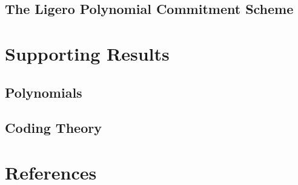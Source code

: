 \section{The Ligero Polynomial Commitment Scheme}


\chapter{Supporting Results}

\section{Polynomials}

\begin{definition}
    \label{def:multilinear_extension}
\end{definition}

\begin{theorem}
    \label{thm:multilinear_extension_unique}
\end{theorem}

\section{Coding Theory}

\begin{definition}
    \label{def:code_distance}
\end{definition}

\begin{definition}
    \label{def:distance_from_code}
\end{definition}

\begin{definition}
    \label{def:generator_matrix}
\end{definition}

\begin{definition}
    \label{def:parity_check_matrix}
\end{definition}

\begin{definition}
    \label{def:interleaved_code}
\end{definition}

\begin{definition}
    \label{def:reed_solomon_code}
\end{definition}

\begin{definition}
    \label{def:proximity_measure}
\end{definition}

\begin{definition}
    \label{def:proximity_gap}
\end{definition}

\chapter{References}

